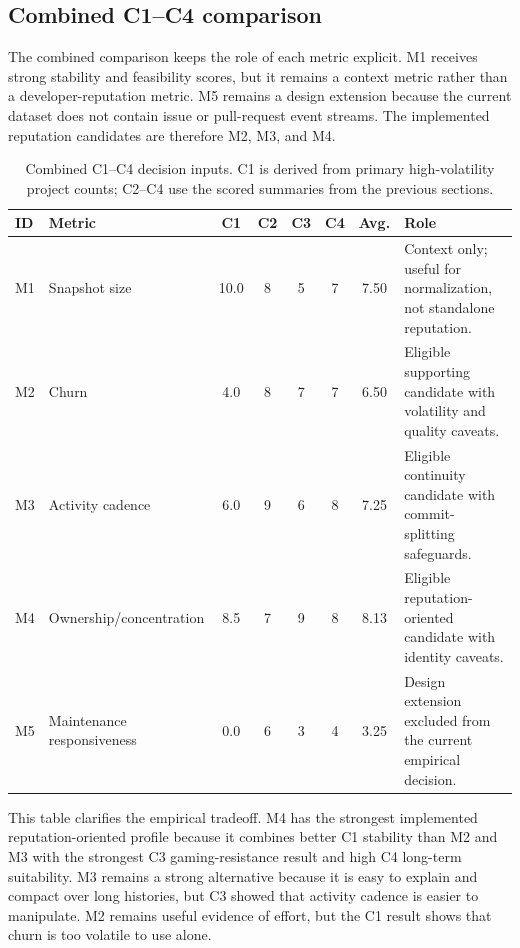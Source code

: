 \subsection{Combined C1--C4 comparison}
\label{sec:combined_c1_c4_comparison}

The combined comparison keeps the role of each metric explicit. M1 receives strong stability and feasibility
scores, but it remains a context metric rather than a developer-reputation metric. M5 remains a design extension
because the current dataset does not contain issue or pull-request event streams. The implemented reputation
candidates are therefore M2, M3, and M4.

\begin{table}[H]
\centering
\scriptsize
\renewcommand{\arraystretch}{1.08}
\begin{tabularx}{\textwidth}{p{0.8cm}p{3.1cm}cccccX}
\toprule
\textbf{ID} & \textbf{Metric} & \textbf{C1} & \textbf{C2} & \textbf{C3} & \textbf{C4} & \textbf{Avg.} & \textbf{Role} \\
\midrule
M1 & Snapshot size & 10.0 & 8 & 5 & 7 & 7.50 & Context only; useful for normalization, not standalone reputation. \\
M2 & Churn & 4.0 & 8 & 7 & 7 & 6.50 & Eligible supporting candidate with volatility and quality caveats. \\
M3 & Activity cadence & 6.0 & 9 & 6 & 8 & 7.25 & Eligible continuity candidate with commit-splitting safeguards. \\
M4 & Ownership/concentration & 8.5 & 7 & 9 & 8 & 8.13 & Eligible reputation-oriented candidate with identity caveats. \\
M5 & Maintenance responsiveness & 0.0 & 6 & 3 & 4 & 3.25 & Design extension excluded from the current empirical decision. \\
\bottomrule
\end{tabularx}
\caption{Combined C1--C4 decision inputs. C1 is derived from primary high-volatility project counts; C2--C4 use the scored summaries from the previous sections.}
\label{tab:phase2_combined_comparison}
\end{table}

This table clarifies the empirical tradeoff. M4 has the strongest implemented reputation-oriented profile because
it combines better C1 stability than M2 and M3 with the strongest C3 gaming-resistance result and high C4
long-term suitability. M3 remains a strong alternative because it is easy to explain and compact over long histories,
but C3 showed that activity cadence is easier to manipulate. M2 remains useful evidence of effort, but the C1 result
shows that churn is too volatile to use alone.

